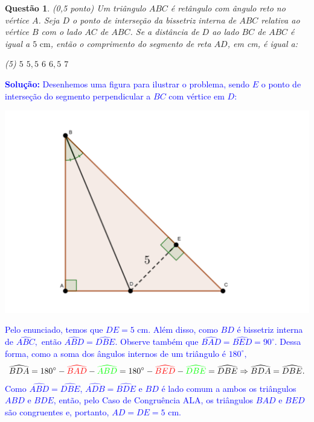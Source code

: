\documentclass[oneside,a4paper,12pt]{article}
\newcommand{\negrito}[1]{\mbox{\boldmath{$#1$}}}
\theoremstyle{Colorido}
\theoremstyle{solu}
\theoremstyle{dotlessP}
\newcommand{\solucao}[1]{\textcolor{blue}{\textbf{Solução:} #1}}
\newtheorem{sol}{Questão}
\begin{document}
	\begin{sol}
\textit{(0,5 ponto)} \newline\newline
Um triângulo $ABC$ é retângulo com ângulo reto no vértice $A$. Seja $D$ o ponto de interseção da bissetriz interna de $ABC$ relativa ao vértice $B$ com o lado $AC$ de $ABC$. Se a distância de $D$ ao lado $BC$ de $ABC$ é igual a $5\mbox{ cm}$, então o comprimento do segmento de reta $AD$, em cm, é igual a:
\begin{tasks}[counter-format={(tsk[a])},label-width=3.6ex, label-format = {\bfseries}, column-sep = {20pt}](5)
\task[\textcolor{blue}{$\negrito{(a)} $}] $5$
\task[\textcolor{blue}{$\negrito{(b)} $}] $5,5$ 
\task[\textcolor{blue}{$\negrito{(c)} $}] $6$
\task[\textcolor{blue}{$\negrito{(d)} $}] $6,5$
\task[\textcolor{blue}{$\negrito{(e)} $}] $7$
\end{tasks}
\end{sol}
\solucao{Desenhemos uma figura para ilustrar o problema, sendo $E$ o ponto de interseção do segmento perpendicular a $BC$ com vértice em $D$:}
\begin{center}
\includegraphics[scale=0.5]{Provas e Avaliações/Figuras avaliações/1avaliacaociclo3.png}
\end{center}
\textcolor{blue}{Pelo enunciado, temos que $DE = 5\mbox{ cm}.$ Além disso, como $BD$ é bissetriz interna de $\widehat{ABC},$ então $\widehat{ABD} = \widehat{DBE}.$ Observe também que $\widehat{BAD} = \widehat{BED} = 90^\circ.$ Dessa forma, como a soma dos ângulos internos de um triângulo é $180^{\circ},$
\[
\widehat{BDA} = 180^{\circ} - \textcolor{red}{\widehat{BAD}} - \textcolor{green}{\widehat{ABD}} = 180^{\circ} - \textcolor{red}{\widehat{BED}} - \textcolor{green}{\widehat{DBE}} = \widehat{DBE} \Rightarrow \widehat{BDA} = \widehat{DBE}.
\]
Como $\widehat{ABD}=\widehat{DBE}$, $\widehat{ADB}=\widehat{BDE}$ e $BD$ é lado comum a ambos os triângulos $ABD$ e $BDE$, então, pelo Caso de Congruência ALA, os triângulos $BAD$ e $BED$ são congruentes e, portanto, $AD=DE=5\mbox{ cm}$.}
\end{document}
